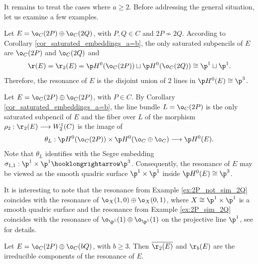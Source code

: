 \documentclass[10pt, leqno]{amsart}
\begin{document}
It remains to treat the cases where $a \ge 2$. Before addressing the general situation, let us examine a few examples.

\begin{exmp} \label{ex:2P_not_sim_2Q}
Let $E = \o_C(2P) \oplus \o_C(2Q)$, with $P, Q \in C$ and $2P \not\sim 2Q$. According to Corollary \ref{cor_saturated_embeddings_a=b}, the only saturated subpencils of $E$ are $\o_C(2P)$ and $\o_C(2Q)$ and
\[
\r(E) = \r_2(E) = \p H^0(\o_C(2P)) \sqcup \p H^0(\o_C(2Q)) \cong \p^1 \sqcup \p^1.
\]
Therefore, the resonance of $E$ is the disjoint union of $2$ lines in $\p H^0(E) \cong \p^3$. 
\end{exmp}

\begin{exmp} \label{ex:2P_sim_2Q}
Let $E = \o_C(2P) \oplus \o_C(2P)$, with $P \in C$. By Corollary \ref{cor_saturated_embeddings_a=b}, the line bundle $L = \o_C(2P)$ is the only saturated subpencil of $E$ and the fiber over $L$ of the morphism $\rho_2 : \r_2(E) \longrightarrow W^1_2(C)$ is the image of
\[
\theta_L : \p H^0(\o_C(2P)) \times \p H^0(\o_C \oplus \o_C) \longrightarrow \p H^0(E).
\]
Note that $\theta_L$ identifies with the Segre embedding $\sigma_{1,1}: \p^1 \times \p^1 \hooklongrightarrow \p^3$. Consequently, the resonance of $E$ may be viewed as the smooth quadric surface $\p^1 \times \p^1$ inside $\p H^0(E) \cong \p^3$.
\end{exmp}

\begin{rem} \label{rem:smooth_quadric}
It is interesting to note that the resonance from Example \ref{ex:2P_not_sim_2Q} coincides with the resonance of $\o_X(1,0) \oplus \o_X(0,1)$, where $X \cong \p^1 \times \p^1$ is a smooth quadric surface and the resonance from Example \ref{ex:2P_sim_2Q} coincides with the resonance of $\o_{\p^1}(1) \oplus \o_{\p^1}(1)$ on the projective line $\p^1$, see \cite[\S 7]{aprodu_linear_2025} for details.
\end{rem}

\begin{prop} \label{prop:2P_bQ}
Let $E = \o_C(2P) \oplus \o_C(bQ)$, with $b \ge 3$. Then $\overline{\r_2(E)}$ and $\r_b(E)$ are the irreducible components of the resonance of $E$.
\end{prop}
\end{document}
